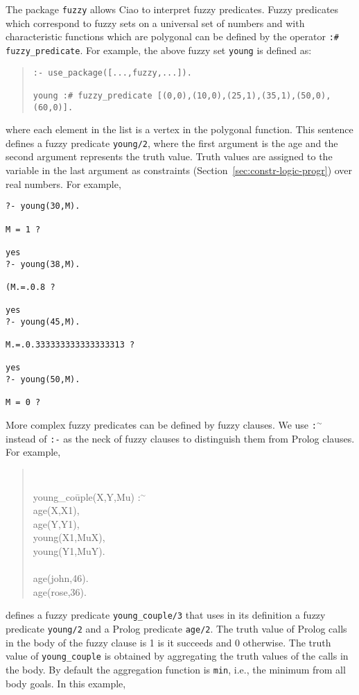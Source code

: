 The package \texttt{fuzzy} allows Ciao to interpret fuzzy
predicates. Fuzzy predicates which correspond to fuzzy sets on a
universal set of numbers and with characteristic functions which are
polygonal can be defined by the operator 
\texttt{:\# fuzzy\_predicate}. For example, the above fuzzy set
\texttt{young} is defined as: 
\begin{quote}
\begin{verbatim}
:- use_package([...,fuzzy,...]).

young :# fuzzy_predicate [(0,0),(10,0),(25,1),(35,1),(50,0),(60,0)].
\end{verbatim}
\end{quote}
%
where each element in the list is a vertex in the polygonal function.
This sentence defines a fuzzy predicate \texttt{young/2}, where the
first argument is the age and the second argument represents the truth
value. Truth values are assigned to the variable in the last argument
as constraints (Section~\ref{sec:constr-logic-progr}) over real
numbers. For example,

\begin{verbatim}
?- young(30,M).

M = 1 ? 

yes
?- young(38,M).

(M.=.0.8 ? 

yes
?- young(45,M).

M.=.0.333333333333333313 ? 

yes
?- young(50,M).

M = 0 ? 
\end{verbatim}

More complex fuzzy predicates can be defined by fuzzy clauses. We use
\texttt{:{\tiny$^\sim$}} instead of \texttt{:-} as the neck of
fuzzy clauses to distinguish them from Prolog clauses. For example,
\begin{quote}
{\tt
\begin{tabbing} 
young\_co\=uple(X,Y,Mu) :{\tiny$^\sim$} \\
\>        age(X,X1), \\
\>        age(Y,Y1),  \\
\>        young(X1,MuX), \\
\>        young(Y1,MuY). \\
\\
age(john,46). \\
age(rose,36).
\end{tabbing}
}
\end{quote}
%
defines a fuzzy predicate \texttt{young\_couple/3} that uses in its
definition a fuzzy predicate \texttt{young/2} and a Prolog predicate
\texttt{age/2}. The truth value of Prolog calls in the body of the
fuzzy clause is 1 is it succeeds and 0 otherwise. The truth value of
\texttt{young\_couple} is obtained by aggregating the truth values of
the calls in the body. By default the aggregation function is
\texttt{min}, i.e., the minimum from all body goals. In this example,

